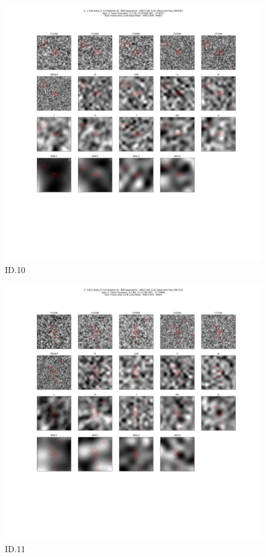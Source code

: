\begin{figure}[tbp]
\centering \includegraphics[width=120mm]{Matched/ASPECS_Cutout_10.png}
\caption{ID.10}
\label{fig:Match_Three}
\end{figure}

\begin{figure}[tbp]
\centering \includegraphics[width=120mm]{Matched/ASPECS_Cutout_11.png}
\caption{ID.11}
\label{fig:Match_Three}
\end{figure}

